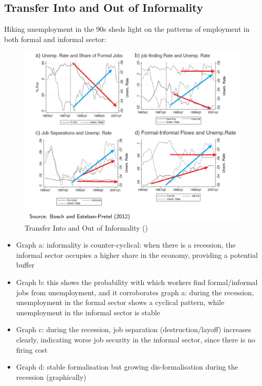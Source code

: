             \subsection{Transfer Into and Out of Informality}
                Hiking unemployment in the 90s sheds light on the patterns of employment in both formal and informal sector:
                \begin{figure}[H]
                    \centering
                    \includegraphics[width=5.5in]{images/ch5/ins and outs of informality.png}
                    \caption{Transfer Into and Out of Informality (\cite{bosch_job_2012})}
                \end{figure}
                \begin{itemize}
                    \item Graph a: informality is counter-cyclical: when there is a recession, the informal sector occupies a higher share in the economy, providing a potential buffer
                    \item Graph b: this shows the probability with which workers find formal/informal jobs from unemployment, and it corroborates graph a: during the recession, unemployment in the formal sector shows a cyclical pattern, while unemployment in the informal sector is stable
                    \item Graph c: during the recession, job separation (destruction/layoff) increases clearly, indicating worse job security in the informal sector, since there is no firing cost
                    \item Graph d: stable formalisation but growing dis-formalisation during the recession (graphically)
                \end{itemize}
            
